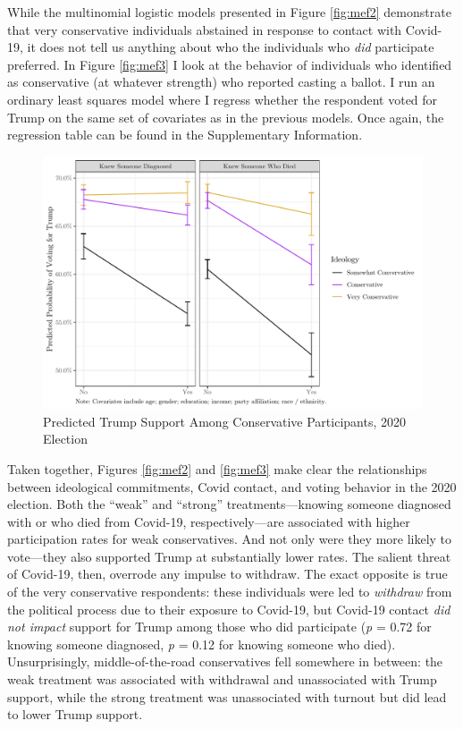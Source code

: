 \documentclass[
  12pt,
]{article}
\begin{document}
While the multinomial logistic models presented in Figure \ref{fig:mef2} demonstrate that very conservative individuals abstained in response to contact with Covid-19, it does not tell us anything about who the individuals who \emph{did} participate preferred. In Figure \ref{fig:mef3} I look at the behavior of individuals who identified as conservative (at whatever strength) who reported casting a ballot. I run an ordinary least squares model where I regress whether the respondent voted for Trump on the same set of covariates as in the previous models. Once again, the regression table can be found in the Supplementary Information.

\begin{figure}[H]

{\centering \includegraphics{theory_paper_files/figure-latex/mef3-c-1} 

}

\caption{\label{fig:mef3}Predicted Trump Support Among Conservative Participants, 2020 Election}\label{fig:mef3-c}
\end{figure}

Taken together, Figures \ref{fig:mef2} and \ref{fig:mef3} make clear the relationships between ideological commitments, Covid contact, and voting behavior in the 2020 election. Both the ``weak'' and ``strong'' treatments---knowing someone diagnosed with or who died from Covid-19, respectively---are associated with higher participation rates for weak conservatives. And not only were they more likely to vote---they also supported Trump at substantially lower rates. The salient threat of Covid-19, then, overrode any impulse to withdraw. The exact opposite is true of the very conservative respondents: these individuals were led to \emph{withdraw} from the political process due to their exposure to Covid-19, but Covid-19 contact \emph{did not impact} support for Trump among those who did participate (\emph{p} = 0.72 for knowing someone diagnosed, \emph{p} = 0.12 for knowing someone who died). Unsurprisingly, middle-of-the-road conservatives fell somewhere in between: the weak treatment was associated with withdrawal and unassociated with Trump support, while the strong treatment was unassociated with turnout but did lead to lower Trump support.
\end{document}
